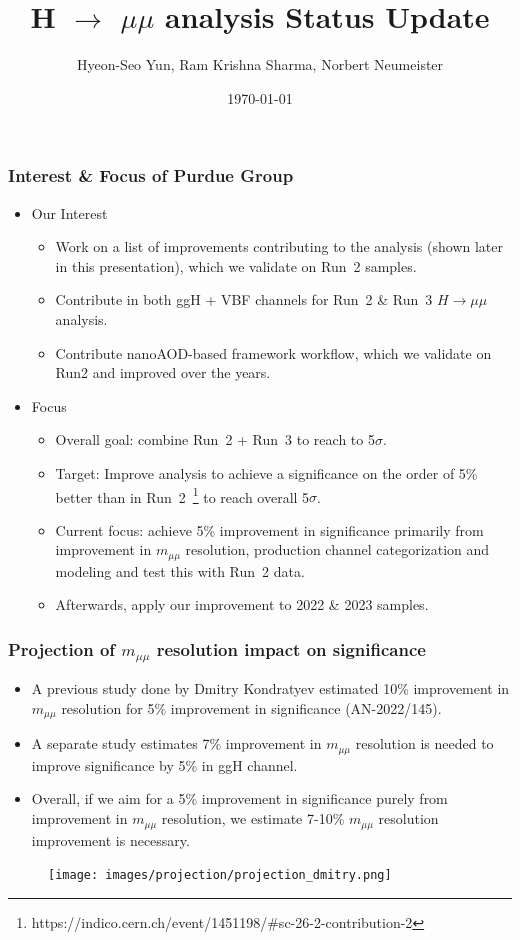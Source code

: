 \documentclass[dvipsnames,aspectratio=169]{beamer}
\title[]{\huge{H $\rightarrow$ $\mu\mu$ analysis Status Update}}
\author[Hyeon-Seo Yun]{Hyeon-Seo Yun, Ram Krishna Sharma, Norbert Neumeister}
\date[\today]{\today}
\institute[Purdue University]{}
\begin{document}
\begin{frame}
  \titlepage
\end{frame}


\begin{frame}
    \frametitle{Interest \& Focus of Purdue Group}
    \begin{itemize}
    \item Our Interest
    \begin{itemize}
    \item Work on a list of improvements contributing to the analysis (shown later in this presentation), which we validate on Run~2 samples.
    \item Contribute in both ggH + VBF channels for Run~2 \& Run~3 $H\rightarrow \mu\mu$ analysis. 
    \item Contribute nanoAOD-based framework workflow, which we validate on Run2 and improved over the years.
    \end{itemize}
    \item Focus
    \begin{itemize}
    \item Overall goal: combine Run~2 + Run~3 to reach to 5$\sigma$.
    \item Target: Improve analysis to achieve a significance on the order of 5\% better than in Run~2~\footnote{https://indico.cern.ch/event/1451198/#sc-26-2-contribution-2} to reach overall 5$\sigma$.
    \item Current focus: achieve 5\% improvement in significance primarily from improvement in $m_{\mu\mu}$ resolution, production channel categorization and modeling and test this with Run~2 data.
    \item Afterwards, apply our improvement to 2022 \& 2023 samples.
    \end{itemize}
    \end{itemize}
\end{frame}

\begin{frame}
    \frametitle{Projection of $m_{\mu\mu}$ resolution impact on significance}
    \begin{itemize}
    \item A previous study done by Dmitry Kondratyev estimated 10\% improvement in $m_{\mu\mu}$ resolution for 5\% improvement in significance (AN-2022/145).
    \item A separate study estimates 7\% improvement in $m_{\mu\mu}$ resolution is needed to improve significance by 5\% in ggH channel.
    \item Overall, if we aim for a 5\% improvement in significance purely from improvement in $m_{\mu\mu}$ resolution, we estimate 7-10\% $m_{\mu\mu}$ resolution improvement is necessary.
    \end{itemize}
    \begin{figure}[!h]
    \centering
    {\texttt{[image: images/projection/projection\_dmitry.png]}}
    \end{figure}
\end{frame}
\end{document}
